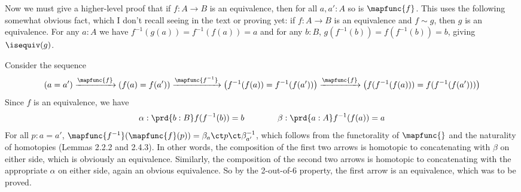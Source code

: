Now we must give a higher-level proof that if $f : A \to B$ is an equivalence,
then for all $a, a' : A$ so is $\mapfunc{f}$.  This uses the following
somewhat obvious fact, which I don't recall seeing in the text or proving yet:
if $f : A \to B$ is an equivalence and $f \sim g$, then $g$ is an equivalence.
For any $a : A$ we have $f^{-1}(g(a)) = f^{-1}(f(a)) = a$
and for any $b : B$, $g(f^{-1}(b)) = f(f^{-1}(b)) = b$, giving $\isequiv(g)$.


Consider the sequence
\[
   \left(a = a'\right) \xrightarrow{\mapfunc{f}} 
   \left(f(a) = f(a')\right) \xrightarrow{\mapfunc{f^{-1}}} 
   \left(f^{-1}(f(a)) = f^{-1}(f(a'))\right) \xrightarrow{\mapfunc{f}} 
   \left(f(f^{-1}(f(a))) = f(f^{-1}(f(a')))\right)
\]
Since $f$ is an equivalence, we have
\[
  \alpha : \prd{b:B} f(f^{-1}(b)) = b
  \qquad\qquad
  \beta : \prd{a:A} f^{-1}(f(a)) = a
\]
For all $p : a = a'$, 
$\mapfunc{f^{-1}}(\mapfunc{f}(p)) = \beta_{a} \ct p \ct \beta_{a'}^{-1}$, 
which follows from the functorality of $\mapfunc{}$ and the naturality of
homotopies (Lemmas 2.2.2 and 2.4.3).  In other words, the composition of the
first two arrows is homotopic to concatenating with $\beta$ on either side,
which is obviously an equivalence.  Similarly, the composition of the second
two arrows is homotopic to concatenating with the appropriate $\alpha$ on
either side, again an obvious equivalence.  So by the 2-out-of-6 property, the
first arrow is an equivalence, which was to be proved.
